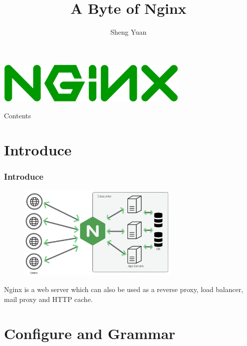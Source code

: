 \documentclass{beamer}
\title{A Byte of Nginx}
\author{Sheng Yuan}
\begin{document}
    
\begin{frame}
	\centering\includegraphics[width=0.7\textwidth]{nginx.png}
    \titlepage
\end{frame}

\begin{frame}{Contents}
    \tableofcontents
\end{frame}

\section{Introduce}
\begin{frame}
\frametitle{Introduce}
	\begin{figure}
		\centering\includegraphics[width=0.7\textwidth]{nginx_architecture.png}
	\end{figure}


Nginx is a web server which can also be used as a reverse proxy, load balancer, mail proxy and HTTP cache\cite{nedelcu2015nginx}.
\end{frame}


\section{Configure and Grammar}
\end{document}
